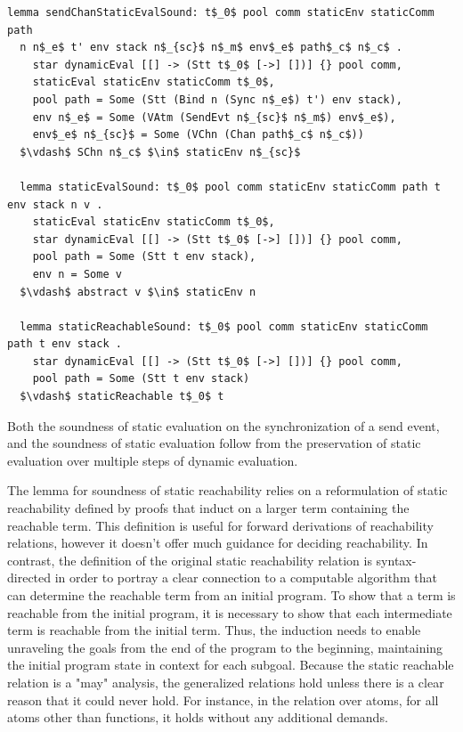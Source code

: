 \documentclass[letterpaper, 11pt]{report}
\begin{document}
\begin{lstlisting}[language=logic, mathescape]
  lemma sendChanStaticEvalSound: t$_0$ pool comm staticEnv staticComm path
  n n$_e$ t' env stack n$_{sc}$ n$_m$ env$_e$ path$_c$ n$_c$ .
    star dynamicEval [[] -> (Stt t$_0$ [->] [])] {} pool comm,
    staticEval staticEnv staticComm t$_0$,
    pool path = Some (Stt (Bind n (Sync n$_e$) t') env stack),
    env n$_e$ = Some (VAtm (SendEvt n$_{sc}$ n$_m$) env$_e$),
    env$_e$ n$_{sc}$ = Some (VChn (Chan path$_c$ n$_c$))
  $\vdash$ SChn n$_c$ $\in$ staticEnv n$_{sc}$

  lemma staticEvalSound: t$_0$ pool comm staticEnv staticComm path t env stack n v .
    staticEval staticEnv staticComm t$_0$, 
    star dynamicEval [[] -> (Stt t$_0$ [->] [])] {} pool comm,
    pool path = Some (Stt t env stack), 
    env n = Some v
  $\vdash$ abstract v $\in$ staticEnv n 

  lemma staticReachableSound: t$_0$ pool comm staticEnv staticComm path t env stack .
    star dynamicEval [[] -> (Stt t$_0$ [->] [])] {} pool comm,
    pool path = Some (Stt t env stack)
  $\vdash$ staticReachable t$_0$ t 
\end{lstlisting}

Both the soundness of static evaluation on the synchronization of a send event,
and the soundness of static evaluation follow from
the preservation of static evaluation over multiple steps of dynamic evaluation.

The lemma for soundness of static reachability relies on a reformulation of
static reachability defined by proofs that induct on a larger term
containing the reachable term. This definition is useful for forward derivations
of reachability relations, however it doesn't offer much guidance for deciding reachability. 
In contrast, the definition of the original static reachability relation is
syntax-directed in order to portray a clear connection to
a computable algorithm that can determine the reachable term from an initial program.
To show that a term is reachable from the initial program, it is necessary to
show that each intermediate term is reachable from the initial term. Thus, the
induction needs to enable unraveling the goals from the end of the program to the beginning,
maintaining the initial program state in context for each subgoal. Because the static
reachable relation is a "may" analysis, the generalized relations hold unless there is
a clear reason that it could never hold.
For instance, in the relation over atoms, for all atoms other than functions, 
it holds without any additional demands.
\end{document}
